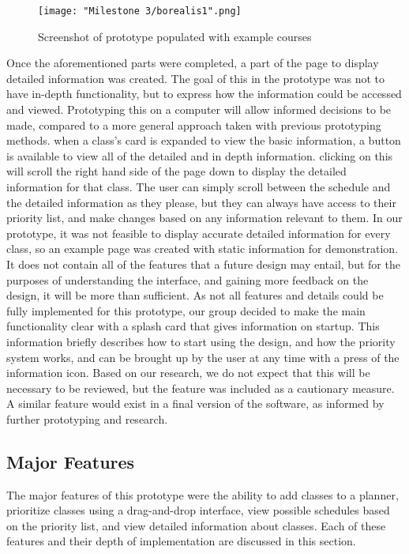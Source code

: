 \documentclass{article}
\begin{document}
\begin{figure}[h]
    \centering
    \texttt{[image: "Milestone 3/borealis1".png]}
    \caption{Screenshot of prototype populated with example courses}
    \label{fig:my_label}
\end{figure}
\noindent
\newline
Once the aforementioned parts were completed, a part of the page to display detailed information was created. The goal of this in the prototype was not to have in-depth functionality, but to express how the information could be accessed and viewed. Prototyping this on a computer will allow informed decisions to be made, compared to a more general approach taken with previous prototyping methods. when a class's card is expanded to view the basic information, a button is available to view all of the detailed and in depth information. clicking on this will scroll the right hand side of the page down to display the detailed information for that class. The user can simply scroll between the schedule and the detailed information as they please, but they can always have access to their priority list, and make changes based on any information relevant to them. In our prototype, it was not feasible to display accurate detailed information for every class, so an example page was created with static information for demonstration. It does not contain all of the features that a future design may entail, but for the purposes of understanding the interface, and gaining more feedback on the design, it will be more than sufficient.
\newline
\newline
As not all features and details could be fully implemented for this prototype, our group decided to make the main functionality clear with a splash card that gives information on startup. This information briefly describes how to start using the design, and how the priority system works, and can be brought up by the user at any time with a press of the information icon. Based on our research, we do not expect that this will be necessary to be reviewed, but the feature was included as a cautionary measure. A similar feature would exist in a final version of the software, as informed by further prototyping and research.


\subsection{Major Features}
The major features of this prototype were the ability to add classes to a planner, prioritize classes using a drag-and-drop interface, view possible schedules based on the priority list, and view detailed information about classes. Each of these features and their depth of implementation are discussed in this section.
\end{document}
